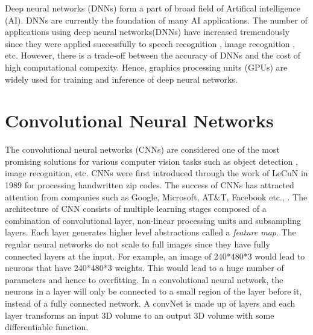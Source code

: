 \documentclass[a4paper, 12pt, oneside, BCOR1cm,toc=chapterentrywithdots]{scrbook}
\begin{document}
 Deep neural networks (DNNs) form a part of broad field of Artifical intelligence (AI). DNNs are currently the foundation of many AI applications\cite{lecun2015deep}. The number of applications using deep neural networks(DNNs) have increased tremendously since they were applied successfully to speech recognition \cite{Deng2013RecentAI}, image recognition \cite{Krizhevsky2012ImageNetCW}, etc. However, there is a trade-off between the accuracy of DNNs and the cost of high computational compexity. Hence, graphics processing units (GPUs) are widely used for training and inference of deep neural networks. 

\section{Convolutional Neural Networks}

The convolutional neural networks (CNNs) are considered one of the most promising solutions for various computer vision tasks such as object detection \cite{ren2015faster}, image recognition, etc. CNNs were first introduced through the work of LeCuN in 1989 \cite{lecun1989backpropagation} for processing handwritten zip codes. The success of CNNs has attracted attention from companies such as Google, Microsoft, AT\&T, Facebook etc., \cite{khan2019survey}. The architecture of CNN consists of multiple learning stages composed of a combination of convolutional layer, non-linear processing units and subsampling layers. Each layer generates higher level abstractions called a \textit{feature map}. The regular neural networks do not scale to full images since they have fully connected layers at the input. For example, an image of 240*480*3 would lead to neurons that have 240*480*3 weights. This would lead to a huge number of parameters and hence to overfitting. In a convolutional neural network, the neurons in a layer will only be connected to a small region of the layer before it, instead of a fully connected network. A convNet is made up of layers and each layer transforms an input 3D volume to an output 3D volume with some differentiable function. 
\end{document}
